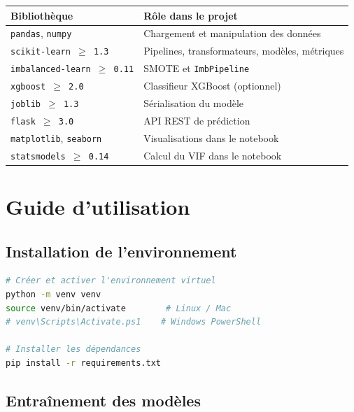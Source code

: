 \documentclass[11pt,a4paper]{article}
\begin{document}
\begin{center}
\begin{tabular}{L{4cm} L{8.5cm}}
\toprule
\textbf{Bibliothèque} & \textbf{Rôle dans le projet} \\
\midrule
\texttt{pandas}, \texttt{numpy} & Chargement et manipulation des données \\
\texttt{scikit-learn $\geq$ 1.3} & Pipelines, transformateurs, modèles, métriques \\
\texttt{imbalanced-learn $\geq$ 0.11} & SMOTE et \texttt{ImbPipeline} \\
\texttt{xgboost $\geq$ 2.0} & Classifieur XGBoost (optionnel) \\
\texttt{joblib $\geq$ 1.3} & Sérialisation du modèle \\
\texttt{flask $\geq$ 3.0} & API REST de prédiction \\
\texttt{matplotlib}, \texttt{seaborn} & Visualisations dans le notebook \\
\texttt{statsmodels $\geq$ 0.14} & Calcul du VIF dans le notebook \\
\bottomrule
\end{tabular}
\end{center}

\section{Guide d'utilisation}

\subsection{Installation de l'environnement}

\begin{lstlisting}[language=bash, caption=Mise en place de l'environnement virtuel]
# Créer et activer l'environnement virtuel
python -m venv venv
source venv/bin/activate        # Linux / Mac
# venv\Scripts\Activate.ps1    # Windows PowerShell

# Installer les dépendances
pip install -r requirements.txt
\end{lstlisting}

\subsection{Entraînement des modèles}
\end{document}
